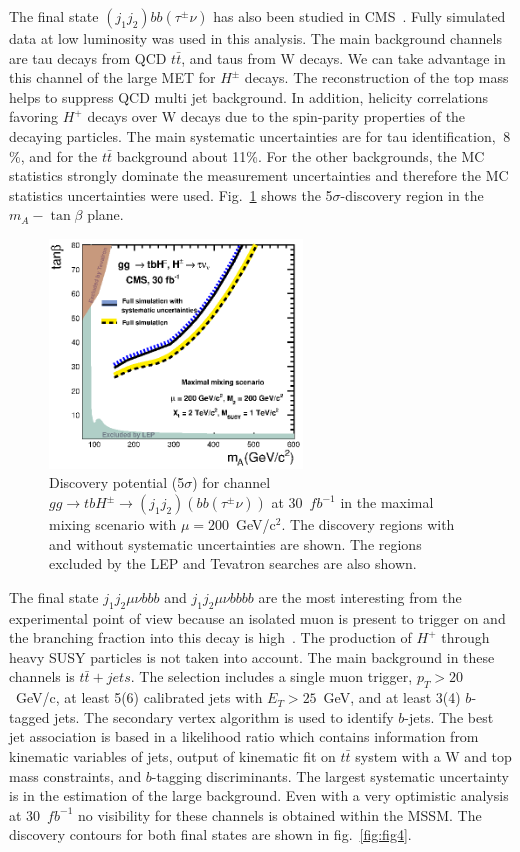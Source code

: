 \documentclass{cimento}
\begin{document}
 
The final state $(j_{1}j_{2})bb(\tau^{\pm}\nu)$ has also been studied in 
CMS~\cite{ref:jjtauAna}. Fully
simulated data at low luminosity was used in this analysis. The main background
channels are tau decays from QCD $t\bar{t}$, and taus from W decays. We can take 
advantage in this channel of the large MET for $H^{\pm}$ decays. The reconstruction
of the top mass helps to suppress QCD multi jet background. In addition, helicity
correlations favoring $H^{+}$ decays over W decays due to the spin-parity
properties of the decaying particles. The main systematic uncertainties are for
tau identification, $~8$\%, and for the $t\bar{t}$ background about 11\%. For the
other backgrounds, the MC statistics strongly dominate the measurement uncertainties
and therefore the MC statistics uncertainties were used. Fig.~\ref{fig:fig3} shows
the 5$\sigma$-discovery region in the $m_{A}-\tan \beta$ plane.


\begin{figure}
\centering
\includegraphics[width=0.6\textwidth]{fig03.ps}

\caption{Discovery potential (5$\sigma$) for channel $gg\rightarrow tbH^{\pm}\rightarrow (j_{1}j_{2})(bb(\tau^{\pm}\nu))$ at 30~$fb^{-1}$ in the maximal mixing scenario with
$\mu = 200$~GeV/c$^{2}$. The discovery regions with and without systematic uncertainties
are shown. The regions excluded by the LEP and Tevatron searches are also shown.}
\label{fig:fig3}
\end{figure}


The final state $j_1j_2\mu\nu bbb$ and $j_1j_2\mu\nu bbbb$ are the most interesting
from the experimental point of view because an isolated muon is present to
trigger on and the branching fraction into this decay is high~\cite{ref:jetsAna}.
The production of $H^{+}$ through heavy SUSY particles is not taken into account.
The main background in these channels is $t\bar{t}+jets$. The selection includes
a single muon trigger, $p_{T}>20$~GeV/c, at least 5(6) calibrated jets with
$E_T>25$~GeV, and at least 3(4) $b$-tagged jets. The secondary vertex algorithm
is used to identify $b$-jets. The best jet association is based in a likelihood
ratio which contains information from kinematic variables of jets, output of
kinematic fit on $t\bar{t}$ system with a W and top mass constraints, and
$b$-tagging discriminants. The largest systematic uncertainty is in the 
estimation of the large background. Even with a very optimistic analysis at
30~$fb^{-1}$ no visibility for these channels is obtained within the MSSM. The
discovery contours for both final states are shown in fig.~\ref{fig:fig4}.
\end{document}
